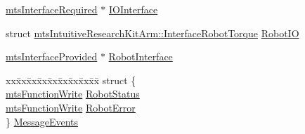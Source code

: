 \begin{DoxyCompactItemize}
\begin{tabbing}
\end{tabbing}\item 
\hyperlink{classmts_interface_required}{mts\+Interface\+Required} $\ast$ \hyperlink{classmts_intuitive_research_kit_arm_af0ea596cde18d92b25eb0b1a5e53ccc3}{I\+O\+Interface}
\item 
struct \hyperlink{structmts_intuitive_research_kit_arm_1_1_interface_robot_torque}{mts\+Intuitive\+Research\+Kit\+Arm\+::\+Interface\+Robot\+Torque} \hyperlink{classmts_intuitive_research_kit_arm_a7112330e6775316517c28a94a116294b}{Robot\+I\+O}
\item 
\hyperlink{classmts_interface_provided}{mts\+Interface\+Provided} $\ast$ \hyperlink{classmts_intuitive_research_kit_arm_a1d8e3354259059e9cc8255a8038b5fc1}{Robot\+Interface}
\item 
\begin{tabbing}
xx\=xx\=xx\=xx\=xx\=xx\=xx\=xx\=xx\=\kill
struct \{\\
\>\hyperlink{classmts_function_write}{mtsFunctionWrite} \hyperlink{classmts_intuitive_research_kit_arm_a375689bcecab40776c6b2e4b732ab2c3}{RobotStatus}\\
\>\hyperlink{classmts_function_write}{mtsFunctionWrite} \hyperlink{classmts_intuitive_research_kit_arm_a79712f082a8907bb4bf6666a45000c64}{RobotError}\\
\} \hyperlink{classmts_intuitive_research_kit_arm_a3fa4d7f88f4d80ce7db17c13fe26b69d}{MessageEvents}\\


\end{tabbing}
\end{DoxyCompactItemize}
